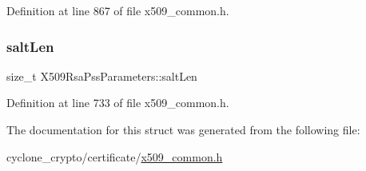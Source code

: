 Definition at line 867 of file x509\+\_\+common.\+h.

\mbox{\label{structX509RsaPssParameters_a0472b015828361df56b2550e4c1ac220}} 
\subsubsection{\texorpdfstring{salt\+Len}{saltLen}}
{\footnotesize\ttfamily size\+\_\+t X509\+Rsa\+Pss\+Parameters\+::salt\+Len}



Definition at line 733 of file x509\+\_\+common.\+h.



The documentation for this struct was generated from the following file\+:\begin{DoxyCompactItemize}
\item 
cyclone\+\_\+crypto/certificate/\hyperlink{certificate_2x509__common_8h}{x509\+\_\+common.\+h}\end{DoxyCompactItemize}
